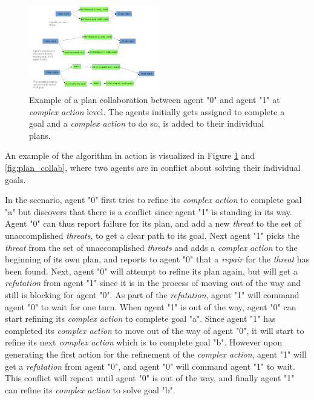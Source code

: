 \documentclass[Main]{subfiles}
\begin{document}
\begin{figure}[h!]
	\centering
	\includegraphics[width=0.5\textwidth]{unhtnpop.png}
	\caption{Example of a plan collaboration between agent "0" and agent "1" at \textit{complex action} level. The agents initially gets assigned to complete a goal and a \textit{complex action} to do so, is added to their individual plans.}
	\label{fig:htn_collab}
\end{figure}

An example of the algorithm in action is visualized in Figure \ref{fig:htn_collab} and \ref{fig:plan_collab}, where two agents are in conflict about solving their individual goals.

In the scenario, agent "0" first tries to refine its \textit{complex action} to complete goal "a" but discovers that there is a conflict since agent "1" is standing in its way.
Agent "0" can thus report failure for its plan, and add a new \textit{threat} to the set of unaccomplished \textit{threats}, to get a clear path to its goal.
Next agent "1" picks the \textit{threat} from the set of unaccomplished \textit{threats} and adds a \textit{complex action} to the beginning of its own plan, and reports to agent "0" that a \textit{repair} for the \textit{threat} has been found.
Next, agent "0" will attempt to refine its plan again, but will get a \textit{refutation} from agent "1" since it is in the process of moving out of the way and still is blocking for agent "0".
As part of the \textit{refutation}, agent "1" will command agent "0" to wait for one turn.
When agent "1" is out of the way, agent "0" can start refining its \textit{complex action} to complete goal "a".
Since agent "1" has completed its \textit{complex action} to move out of the way of agent "0", it will start to refine its next \textit{complex action} which is to complete goal "b".
However upon generating the first action for the refinement of the \textit{complex action}, agent "1" will get a \textit{refutation} from agent "0", and agent "0" will command agent "1" to wait.
This conflict will repeat until agent "0" is out of the way, and finally agent "1" can refine its \textit{complex action} to solve goal "b".




\end{document}
